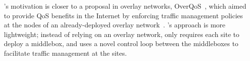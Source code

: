 
 \name's motivation is closer to a proposal in overlay networks, OverQoS~\cite{overqos}, which aimed to provide QoS benefits in the Internet by enforcing traffic management policies at the nodes of an already-deployed overlay network~\cite{ron}. 
\name's approach is more lightweight; instead of relying on an overlay network, \name only requires each site to deploy a middlebox, and uses a novel control loop between the middleboxes to facilitate traffic management at the sites. 


